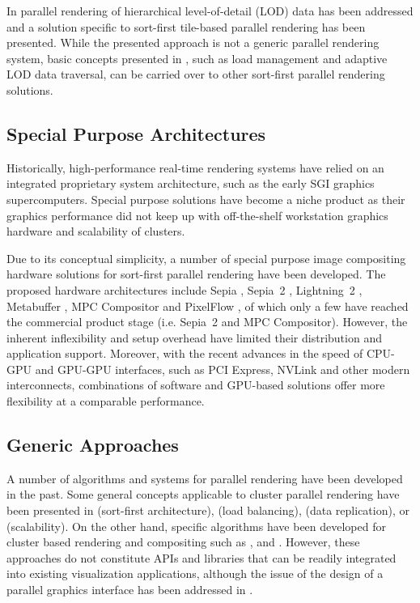 In \cite{NC:07} parallel rendering of hierarchical level-of-detail (LOD) data
has been addressed and a solution specific to sort-first tile-based parallel
rendering has been presented. While the presented approach is not a generic
parallel rendering system, basic concepts presented in \cite{NC:07}, such as load
management and adaptive LOD data traversal, can be carried over to other
sort-first parallel rendering solutions.

\subsection{Special Purpose Architectures}

Historically, high-performance real-time rendering systems have relied on an
integrated proprietary system architecture, such as the early SGI graphics supercomputers. Special purpose solutions have become a niche product as their
graphics performance did not keep up with off-the-shelf workstation graphics
hardware and scalability of clusters.

Due to its conceptual simplicity, a number of special purpose image compositing
hardware solutions for sort-first parallel rendering have been developed. The
proposed hardware architectures include Sepia \cite {MHS:99a,sepia}, Sepia~2
\cite{LMSBHa:01,LMSBH:01}, Lightning~2 \cite{Stoll01}, Metabuffer
\cite{Blanke00,Zhang01}, MPC Compositor \cite{Muraki01} and PixelFlow
\cite{Molnar92,Eyles97}, of which only a few have reached the commercial
product stage (i.e. Sepia~2 and MPC Compositor). However, the inherent
inflexibility and setup overhead have limited their distribution and
application support. Moreover, with the recent advances in the speed of CPU-GPU
and GPU-GPU interfaces, such as PCI Express, NVLink and other modern
interconnects, combinations of software and GPU-based solutions offer more
flexibility at a comparable performance.

\subsection{Generic Approaches}

A number of algorithms and systems for parallel rendering have been developed in
the past. Some general concepts applicable to cluster parallel
rendering have been presented in \cite{Mueller:95,Mueller:97} (sort-first
architecture), \cite{SZFLS:99,SFLS:00} (load balancing), \cite{SFL:01} (data
replication), or \cite{CMF:05,CM:06} (scalability). On the other hand, specific
algorithms have been developed for cluster based rendering and compositing such
as \cite{AP:98}, \cite{CKS:02} and \cite{YYC:01,SMLAP:03}. However, these
approaches do not constitute APIs and libraries that can be readily integrated
into existing visualization applications, although the issue of the design of a
parallel graphics interface has been addressed in \cite{Igehy98}.

